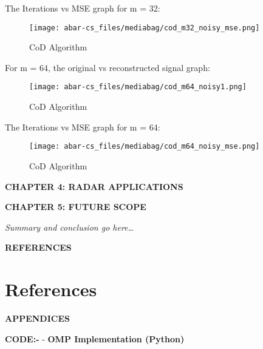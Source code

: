 \documentclass[
  letterpaper,
  DIV=11,
  numbers=noendperiod]{scrartcl}
\providecommand{\mainsection}[1]{\begin{center}{\rmfamily\textbf{\fontsize{14}{20}\selectfont #1}}\end{center}}
\begin{document}
The Iterations vs MSE graph for m = 32:

\begin{figure}[H]

{\centering \texttt{[image: abar-cs\_files/mediabag/cod\_m32\_noisy\_mse.png]}

}

\caption{CoD Algorithm}

\end{figure}%

For m = 64, the original vs reconstructed signal graph:

\begin{figure}[H]

{\centering \texttt{[image: abar-cs\_files/mediabag/cod\_m64\_noisy1.png]}

}

\caption{CoD Algorithm}

\end{figure}%

The Iterations vs MSE graph for m = 64:

\begin{figure}[H]

{\centering \texttt{[image: abar-cs\_files/mediabag/cod\_m64\_noisy\_mse.png]}

}

\caption{CoD Algorithm}

\end{figure}%

\newpage

\mainsection{CHAPTER 4: RADAR APPLICATIONS}

\newpage

\mainsection{CHAPTER 5: FUTURE SCOPE}

\emph{Summary and conclusion go here\ldots{}} \newpage

\mainsection{REFERENCES}

\section{References}\label{references}

\printbibliography[heading=none]

\newpage

\mainsection{APPENDICES}

\textbf{CODE:-} - \textbf{OMP Implementation (Python)}
\end{document}

